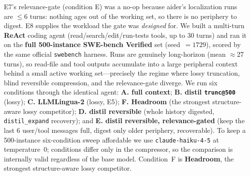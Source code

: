 \documentclass[11pt]{article}
\newcommand{\sweEeightN}{500}\newcommand{\sweEeightSeed}{1729}%
\begin{document}
E7's relevance-gate (condition E) was a no-op because aider's localization runs are
$\le$6 turns: nothing ages out of the working set, so there is no periphery to digest.
E8 supplies the workload the gate was \emph{designed} for. We built a multi-turn
\textbf{ReAct} coding agent (read/search/edit/run-tests tools, up to 30 turns) and ran it
on the \textbf{full \sweEeightN{}-instance SWE-bench Verified} set (seed~$=\sweEeightSeed{}$),
scored by the same official \texttt{swebench} harness. Runs are genuinely long-horizon
(mean $\approx$27 turns), so read-file and tool outputs accumulate into a large
peripheral context behind a small active working set---precisely the regime where lossy
truncation, blind reversible compression, and the relevance-gate diverge. We run six
conditions through the identical agent: \textbf{A. full context}; \textbf{B. distil
\texttt{trunc@500}} (lossy); \textbf{C. LLMLingua-2} (lossy, E5); \textbf{F. Headroom} (the
strongest structure-aware lossy competitor); \textbf{D. distil reversible} (whole history digested,
\texttt{distil\_expand} recovery); and \textbf{E. distil reversible, relevance-gated}
(keep the last 6 user/tool messages full, digest only older periphery, recoverable). To
keep a \sweEeightN{}-instance six-condition sweep affordable we use
\texttt{claude-haiku-4-5} at temperature~0; conditions differ only in the compressor, so
the comparison is internally valid regardless of the base model. Condition~F is
\textbf{Headroom}, the strongest structure-aware lossy competitor.
\end{document}
